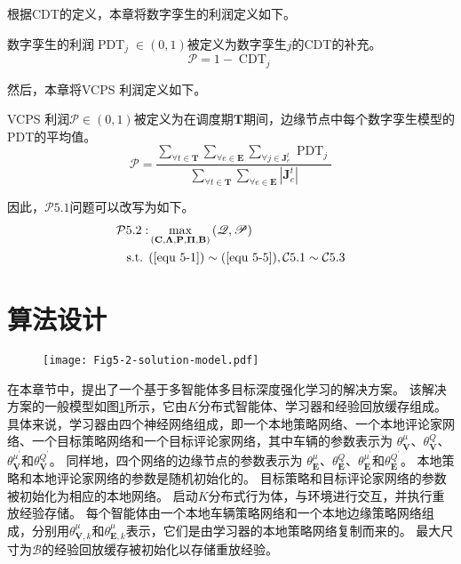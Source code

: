 根据CDT的定义，本章将数字孪生的利润定义如下。
\begin{definition}
数字孪生的利润$\operatorname{PDT}_{j} \in (0, 1)$被定义为数字孪生$j$的CDT的补充。
	\begin{equation}
		\mathscr{P}= 1 - \operatorname{CDT}_{j}
	\end{equation}
\end{definition}
\noindent 然后，本章将VCPS 利润定义如下。
\begin{definition}
VCPS 利润$\mathscr{P} \in (0, 1)$被定义为在调度期$\mathbf{T}$期间，边缘节点中每个数字孪生模型的PDT的平均值。
	\begin{equation}
		\mathscr{P}= \frac{\sum_{\forall t \in \mathbf{T}} \sum_{\forall e \in \mathbf{E}} \sum_{\forall j \in \mathbf{J}_e^t}   \operatorname{PDT}_{j} }{\sum_{\forall t \in \mathbf{T}} \sum_{\forall e \in \mathbf{E}} |\mathbf{J}_e^t| }
	\end{equation}
\end{definition}
\noindent 因此，$\mathcal{P}5.1$问题可以改写为如下。
\begin{align}
	\mathcal{P}5.2: & \max_{( \mathbf{C}, \bf\Lambda, \mathbf{P}, \bf\Pi, \mathbf{B} )} \left (\mathscr{Q}, \mathscr{P} \right ) \notag \\
		\text { s.t. }
	&(\ref{equ 5-1}) \sim (\ref{equ 5-5}), \mathcal{C}5.1 \sim \mathcal{C}5.3
\end{align}

\section{算法设计}\label{section 5-5}

\begin{figure}[h]
\centering
  \texttt{[image: Fig5-2-solution-model.pdf]}
  \label{fig 5-2}
\end{figure}

在本章节中，提出了一个基于多智能体多目标深度强化学习的解决方案。
该解决方案的一般模型如图\ref{fig 5-2}所示，它由$K$分布式智能体、学习器和经验回放缓存组成。
具体来说，学习器由四个神经网络组成，即一个本地策略网络、一个本地评论家网络、一个目标策略网络和一个目标评论家网络，其中车辆的参数表示为 $\theta_{\mathbf{V}}^{\mu}$、$\theta_{\mathbf{V}}^{Q}$、 $\theta_{\mathbf{V}}^{\mu^{\prime}}$和$\theta_{\mathbf{V}}^{Q^{\prime}}$。
同样地，四个网络的边缘节点的参数表示为 $\theta_{\mathbf{E}}^{\mu}$、$\theta_{\mathbf{E}}^{Q}$、$\theta_{\mathbf{E}}^{\mu^{\prime}}$和$\theta_{\mathbf{E}}^{Q^{\prime}}$。
本地策略和本地评论家网络的参数是随机初始化的。
目标策略和目标评论家网络的参数被初始化为相应的本地网络。
启动$K$分布式行为体，与环境进行交互，并执行重放经验存储。
每个智能体由一个本地车辆策略网络和一个本地边缘策略网络组成，分别用$\theta_{\mathbf{V}, k}^{\mu}$和$\theta_{\mathbf{E}, k}^{\mu}$表示，它们是由学习器的本地策略网络复制而来的。
最大尺寸为$\mathcal{B}$的经验回放缓存被初始化以存储重放经验。

